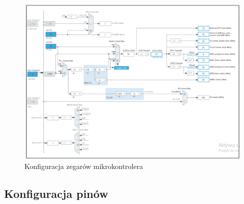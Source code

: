\documentclass[10pt, a4paper]{article}
\begin{document}
\newpage
\begin{figure}[H]
	\centering
	\includegraphics[width=0.9\textheight,angle=90]{zegary.PNG}
	\caption{Konfiguracja zegarów mikrokontrolera}
	\label{fig:KonfiguracjaZegara}
\end{figure}

\subsection{Konfiguracja pinów}
\end{document}
